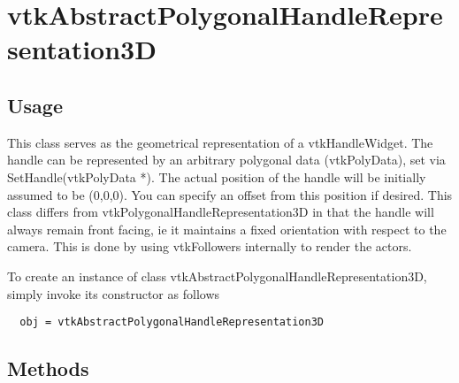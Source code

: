 \section{vtkAbstractPolygonalHandleRepresentation3D}

\subsection{Usage}

 This class serves as the geometrical representation of a vtkHandleWidget. 
 The handle can be represented by an arbitrary polygonal data (vtkPolyData),
 set via SetHandle(vtkPolyData *). The actual position of the handle 
 will be initially assumed to be (0,0,0). You can specify an offset from
 this position if desired. This class differs from 
 vtkPolygonalHandleRepresentation3D in that the handle will always remain
 front facing, ie it maintains a fixed orientation with respect to the 
 camera. This is done by using vtkFollowers internally to render the actors.

To create an instance of class vtkAbstractPolygonalHandleRepresentation3D, simply
invoke its constructor as follows
\begin{verbatim}
  obj = vtkAbstractPolygonalHandleRepresentation3D
\end{verbatim}
\subsection{Methods}

